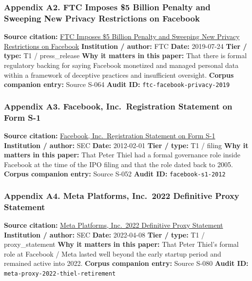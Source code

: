 \documentclass[
  american,
  11pt,
  letterpaper,
]{article}
\begin{document}
\subsubsection{Appendix A2. FTC Imposes \$5 Billion Penalty and Sweeping
New Privacy Restrictions on
Facebook}\label{appendix-a2-ftc-imposes-5-billion-penalty-and-sweeping-new-privacy-restrictions-on-facebook}

\textbf{Source citation:}
\href{https://www.ftc.gov/news-events/news/press-releases/2019/07/ftc-imposes-5-billion-penalty-sweeping-new-privacy-restrictions-facebook}{FTC
Imposes \$5 Billion Penalty and Sweeping New Privacy Restrictions on
Facebook} \textbf{Institution / author:} FTC \textbf{Date:} 2019-07-24
\textbf{Tier / type:} T1 / press\_release \textbf{Why it matters in this
paper:} That there is formal regulatory backing for saying Facebook
monetized and managed personal data within a framework of deceptive
practices and insufficient oversight. \textbf{Corpus companion entry:}
Source S-064 \textbf{Audit ID:} \texttt{ftc-facebook-privacy-2019}

\subsubsection{Appendix A3. Facebook, Inc.~Registration Statement on
Form
S-1}\label{appendix-a3-facebook-inc-registration-statement-on-form-s-1}

\textbf{Source citation:}
\href{https://www.sec.gov/Archives/edgar/data/1326801/000119312512034517/d287954ds1.htm}{Facebook,
Inc.~Registration Statement on Form S-1} \textbf{Institution / author:}
SEC \textbf{Date:} 2012-02-01 \textbf{Tier / type:} T1 / filing
\textbf{Why it matters in this paper:} That Peter Thiel had a formal
governance role inside Facebook at the time of the IPO filing and that
the role dated back to 2005. \textbf{Corpus companion entry:} Source
S-052 \textbf{Audit ID:} \texttt{facebook-s1-2012}

\subsubsection{Appendix A4. Meta Platforms, Inc.~2022 Definitive Proxy
Statement}\label{appendix-a4-meta-platforms-inc-2022-definitive-proxy-statement}

\textbf{Source citation:}
\href{https://www.sec.gov/Archives/edgar/data/1326801/000132680122000043/meta2022definitiveproxysta.htm}{Meta
Platforms, Inc.~2022 Definitive Proxy Statement} \textbf{Institution /
author:} SEC \textbf{Date:} 2022-04-08 \textbf{Tier / type:} T1 /
proxy\_statement \textbf{Why it matters in this paper:} That Peter
Thiel's formal role at Facebook / Meta lasted well beyond the early
startup period and remained active into 2022. \textbf{Corpus companion
entry:} Source S-080 \textbf{Audit ID:}
\texttt{meta-proxy-2022-thiel-retirement}
\end{document}
